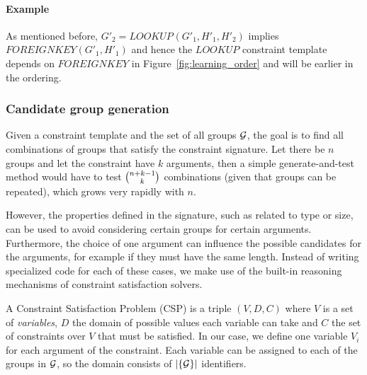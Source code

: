 \documentclass{sig-alternate-05-2015}
\newcommand{\format}[1]{\textit{#1}\xspace}
\newcommand{\template}{\format{constraint template}}
\newcommand{\CSignature}{Signature\xspace}
\newcommand{\CFunction}{Definition\xspace}
\newcommand{\groups}{\ensuremath{\mathcal{G}}\xspace}
\newcommand{\eccalc}[2]{\ensuremath{#1 = #2}}
\newcommand{\ecrank}[2]{\eccalc{#1}{\mathit{RANK}(#2)}}
\newcommand{\ecfkey}[2]{\ensuremath{\mathit{FOREIGNKEY}(#1,#2)}}
\newcommand{\eclookupf}[4]{\ensuremath{\mathit{LOOKUP}_{\mathit{#4}}(#1, #2, #3)}}
\newcommand{\eclookup}[4]{\eccalc{#1}{\eclookupf{#2}{#3}{#4}{}}}
\begin{document}
\paragraph{Example}
As mentioned before, $\eclookup{G'_2}{G'_1}{H'_1}{H'_2}$ implies $\ecfkey{G'_1}{H'_1}$ and hence the $LOOKUP$ constraint template depends on $FOREIGNKEY$ in Figure~\ref{fig:learning_order} and will be earlier in the ordering.


\subsubsection{Candidate group generation}
Given a constraint template and the set of all groups ${\cal G}$, the goal is to find all combinations of groups that satisfy the constraint signature. Let there be $n$ groups and let the constraint have $k$ arguments, then a simple generate-and-test method would have to test $\tbinom{n+k-1}{k}$ combinations (given that groups can be repeated), which grows very rapidly with $n$.

However, the properties defined in the signature, such as related to type or size, can be used to avoid considering certain groups for certain arguments. Furthermore, the choice of one argument can influence the possible candidates for the arguments, for example if they must have the same length. Instead of writing specialized code for each of these cases, we make use of the built-in reasoning mechanisms of constraint satisfaction solvers.


A Constraint Satisfaction Problem (CSP) is a triple $(V,D,C)$ where $V$ is a set of \textit{variables}, $D$ the domain of possible values each variable can take and $C$ the set of constraints over $V$ that must be satisfied. In our case, we define one variable $V_i$ for each argument of the constraint. Each variable can be assigned to each of the groups in ${\cal G}$, so the domain consists of $|\{\cal G\}|$ identifiers.
\end{document}
